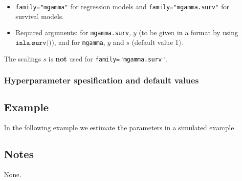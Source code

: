 \documentclass[a4paper,11pt]{article}
\begin{document}
\begin{itemize}
\item \texttt{family="mgamma"} for regression models and
    \texttt{family="mgamma.surv"} for survival models.
\item Required arguments: for \texttt{mgamma.surv}, $y$ (to be given in
    a format by using $\texttt{inla.surv()}$), and for \texttt{mgamma},
    $y$ and $s$ (default value 1).
\end{itemize}
The scalings $s$ is \textbf{not} used for \texttt{family="mgamma.surv"}.

\subsubsection*{Hyperparameter spesification and default values}




\subsection*{Example}
In the following example we estimate the parameters in a simulated
example.


\subsection*{Notes}

None.
\end{document}
